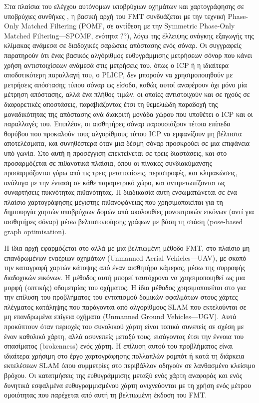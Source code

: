 Στα πλαίσια του ελέγχου αυτόνομων υποβρύχιων οχημάτων και χαρτογράφησης σε
υποβρύχιες συνθήκες \cite{Bulow2010}, η βασική αρχή του FMT συνδυάζεται με την
τεχνική Phase-Only Matched Filtering (POMF, σε αντίθεση με την Symmetric
Phase-Only Matched Filtering---SPOMF, ενότητα ??), λόγω της έλλειψης ανάγκης
εξαγωγής της κλίμακας ανάμεσα σε διαδοχικές σαρώσεις απόστασης ενός σόναρ. Οι
συγγραφείς παρατηρούν ότι ένας βασικός αλγόριθμος ευθυγράμμισης μετρήσεων σόναρ
που κάνει χρήση αντιστοιχίσεων ανάμεσά στις μετρήσεις του, όπως ο ICP ή η
ιδιαίτερα αποδοτικότερη παραλλαγή του, ο PLICP, δεν μπορούν να χρησιμοποιηθούν
με μετρήσεις απόστασης τύπου σόναρ ως είσοδο, καθώς αυτοί αναφέρουν όχι μόνο
μία μέτρηση απόστασης, αλλά ένα πλήθος τιμών, οι οποίες αντιστοιχούν και σε
ηχούς σε διαφορετικές αποστάσεις, παραβιάζοντας έτσι τη θεμελιώδη παραδοχή
της μοναδικότητας της απόστασης ανά διακριτή μονάδα χώρου που υποθέτει ο ICP
και οι παραλλαγές του.  Επιπλέον, οι αισθητήρες σόναρ παρουσιάζουν τέτοια
επίπεδα θορύβου που προκαλούν τους αλγορίθμους τύπου ICP να εμφανίζουν μη
βέλτιστα αποτελέσματα, και συνηθέστερα όταν μια δέσμη σόναρ προσκρούει σε μια
επιφάνεια υπό γωνία. Στο \cite{Bulow2011} αυτή η προσέγγιση επεκτείνεται σε
τρεις διαστάσεις, και στο \cite{Pfingsthorn2010} προσαρμόζεται σε πιθανοτικά
πλαίσια, όπου οι πίνακες συνδιακύμανσης προσαρμόζονται γύρω από τις τρεις
μετατοπίσεις, περιστροφές, και κλιμακώσεις, ανάλογα με την ένταση σε κάθε
παραμετρικό χώρο, και αντιμετωπίζονται ως συναρτήσεις πυκνότητας πιθανότητας. Η
διαδικασία αυτή ενσωματώνεται σε ένα πλαίσιο χαρτογράφησης μέγιστης
πιθανοφάνειας που χρησιμοποιείται για τη δημιουργία χαρτών υποβρύχιων δομών
από ακολουθίες μονοπτρικών εικόνων (αντί για αισθητήρες σόναρ) μέσω
βελτιστοποίησης γράφων με βάση τη στάση (pose-based graph optimisation).

Η ίδια αρχή εφαρμόζεται στο \cite{Bulow2009} αλλά με μια βελτιωμένη μέθοδο FMT,
στο πλαίσιο μη επανδρωμένων εναέριων οχημάτων (Unmanned Aerial Vehicles---UAV),
με σκοπό την καταγραφή χαρτών κάτοψης από έναν αισθητήρα κάμερας, μέσω της
συρραφής διαδοχικών εικόνων. Η μέθοδος αυτή μπορεί ταυτόχρονα να χρησιμοποιηθεί
ως μια μορφή (οπτικής) οδομετρίας του οχήματος. Η ίδια μέθοδος χρησιμοποιείται
στο \cite{Birk2010} για την επίλυση του προβλήματος του εντοπισμού δομικών
σφαλμάτων στους χάρτες πλέγματος κατάληψης που παράγονται από αλγορίθμους SLAM
που εκτελούνται σε μη επανδρωμένα επίγεια οχήματα (Unmanned Ground
Vehicles---UGV). Αυτά προκύπτουν όταν περιοχές του συνολικού χάρτη είναι τοπικά
συνεπείς σε σχέση με έναν καθολικό χάρτη, αλλά ασυνεπείς μεταξύ τους,
εισάγοντας έτσι την έννοια του σπασίματος (brokenness) ενός χάρτη. Η επίλυση
αυτού του προβλήματος είναι ιδιαίτερα χρήσιμη στο έργο χαρτογράφησης πολλαπλών
ρομπότ ή κατά τη διάρκεια εκτελέσεων SLAM όπου συμμετρίες στο περιβάλλον
οδηγούν σε λανθασμένο κλείσιμο βρόχου. Οι κατατμήσεις της ευθυγράμμισης μεταξύ
ενός χάρτη αναφοράς και ενός δυνητικά εσφαλμένα ευθυγραμμισμένου χάρτη
ανιχνεύονται με τη χρήση ενός μέτρου ομοιότητας που παρέχεται από αυτή τη
βελτιωμένη έκδοση του FMT.


